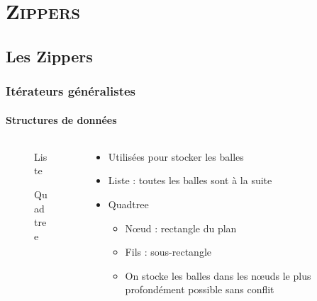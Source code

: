 \documentclass[xcolor=x11names,compress,11pt]{beamer}
\renewcommand{\(}{\begin{columns}}
\renewcommand{\)}{\end{columns}}
\newcommand{\<}[1]{\begin{column}{#1}}
\renewcommand{\>}{\end{column}}
\begin{document}
\section{\scshape Zippers}

\subsection*{Les Zippers}

\begin{frame}
\frametitle{Itérateurs généralistes}
\framesubtitle{Structures de données}

\begin{columns}
\begin{column}[l]{0.35\textwidth}

\begin{figure}[ht]
  \centering
  \caption{Liste}
\end{figure}

\begin{figure}[ht]
  \centering
  \caption{Quadtree}
\end{figure}
\end{column}

\begin{column}[r]{0.65\textwidth}
  
  \begin{itemize}
  \item Utilisées pour stocker les balles
  \item Liste : toutes les balles sont à la suite
  \item Quadtree
    \begin{itemize}
    \item Nœud : rectangle du plan
    \item Fils : sous-rectangle
    \item On stocke les balles dans les nœuds le plus profondément
      possible sans conflit
    \end{itemize}


\end{itemize}
\end{column}
\end{columns}
\end{frame}
\end{document}
